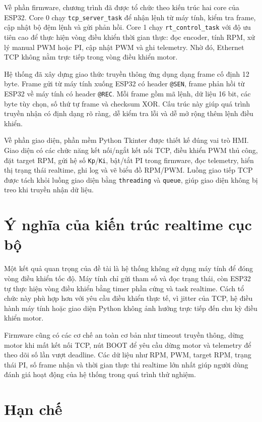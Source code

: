 \documentclass[12pt,a4paper]{report}
\begin{document}
Về phần firmware, chương trình đã được tổ chức theo kiến trúc hai core của ESP32. Core 0 chạy \texttt{tcp\_server\_task} để nhận lệnh từ máy tính, kiểm tra frame, cập nhật bộ đệm lệnh và gửi phản hồi. Core 1 chạy \texttt{rt\_control\_task} với độ ưu tiên cao để thực hiện vòng điều khiển thời gian thực: đọc encoder, tính RPM, xử lý manual PWM hoặc PI, cập nhật PWM và ghi telemetry. Nhờ đó, Ethernet TCP không nằm trực tiếp trong vòng điều khiển motor.

Hệ thống đã xây dựng giao thức truyền thông ứng dụng dạng frame cố định 12 byte. Frame gửi từ máy tính xuống ESP32 có header \texttt{@SEN}, frame phản hồi từ ESP32 về máy tính có header \texttt{@REC}. Mỗi frame gồm mã lệnh, dữ liệu 16 bit, các byte tùy chọn, số thứ tự frame và checksum XOR. Cấu trúc này giúp quá trình truyền nhận có định dạng rõ ràng, dễ kiểm tra lỗi và dễ mở rộng thêm lệnh điều khiển.

Về phần giao diện, phần mềm Python Tkinter được thiết kế đúng vai trò HMI. Giao diện có các chức năng kết nối/ngắt kết nối TCP, điều khiển PWM thủ công, đặt target RPM, gửi hệ số \texttt{Kp}/\texttt{Ki}, bật/tắt PI trong firmware, đọc telemetry, hiển thị trạng thái realtime, ghi log và vẽ biểu đồ RPM/PWM. Luồng giao tiếp TCP được tách khỏi luồng giao diện bằng \texttt{threading} và \texttt{queue}, giúp giao diện không bị treo khi truyền nhận dữ liệu.

\section{Ý nghĩa của kiến trúc realtime cục bộ}

Một kết quả quan trọng của đề tài là hệ thống không sử dụng máy tính để đóng vòng điều khiển tốc độ. Máy tính chỉ gửi tham số và đọc trạng thái, còn ESP32 tự thực hiện vòng điều khiển bằng timer phần cứng và task realtime. Cách tổ chức này phù hợp hơn với yêu cầu điều khiển thực tế, vì jitter của TCP, hệ điều hành máy tính hoặc giao diện Python không ảnh hưởng trực tiếp đến chu kỳ điều khiển motor.

Firmware cũng có các cơ chế an toàn cơ bản như timeout truyền thông, dừng motor khi mất kết nối TCP, nút BOOT để yêu cầu dừng motor và telemetry để theo dõi số lần vượt deadline. Các dữ liệu như RPM, PWM, target RPM, trạng thái PI, số frame nhận và thời gian thực thi realtime lớn nhất giúp người dùng đánh giá hoạt động của hệ thống trong quá trình thử nghiệm.

\section{Hạn chế}
\end{document}
